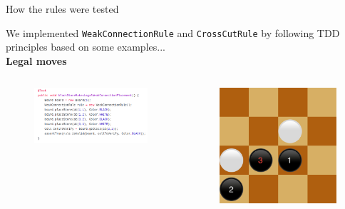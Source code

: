 \documentclass{beamer}
\begin{document}
\begin{frame}[t]{How the rules were tested }
 
 We implemented \texttt{WeakConnectionRule} and \texttt{CrossCutRule} by following TDD principles based on some examples...\\
 \vspace{0.1cm}
 \textbf{Legal moves}
 \begin{columns}
  \begin{figure}[t]
   \includegraphics[scale=0.27]{images/test-legal-weak.png}
  \end{figure}
  \begin{figure}[t]
   \includegraphics[scale=0.24]{images/legal_weak.png}
  \end{figure}
  

\end{columns}
\end{frame}
\end{document}

